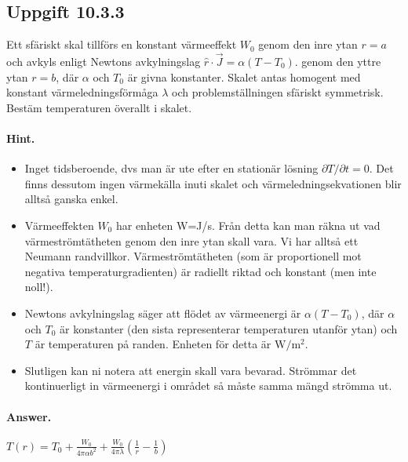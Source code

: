 \documentclass[%
oneside,                 %
final,                   %
10pt]{article}
\newenvironment{doconceexercise}{}{}
\newcounter{doconceexercisecounter}
\begin{document}
\begin{doconceexercise}

\subsection{Uppgift 10.3.3}

Ett sfäriskt skal tillförs en konstant värmeeffekt $W_0$ genom den inre  ytan $r= a$ och avkyls enligt Newtons avkylningslag
$\hat r\cdot \vec J = \alpha\left(T-T_0\right)$.
genom den yttre ytan $r = b$, där $\alpha$ och $T_0$ är givna konstanter. Skalet antas homogent med konstant värmeledningsförmåga $\lambda$ och problemställningen sfäriskt symmetrisk. Bestäm temperaturen överallt i skalet.


\paragraph{Hint.}
\begin{itemize}
\item Inget tidsberoende, dvs man är ute efter en stationär lösning $\partial T / \partial t = 0$. Det finns dessutom ingen värmekälla inuti skalet och värmeledningsekvationen blir alltså ganska enkel.

\item Värmeeffekten $W_0$ har enheten W=J/s. Från detta kan man räkna ut vad värmeströmtätheten genom den inre ytan skall vara. Vi har alltså ett Neumann randvillkor. Värmeströmtätheten (som är proportionell mot negativa temperaturgradienten) är radiellt riktad och konstant (men inte noll!).

\item Newtons avkylningslag säger att flödet av värmeenergi är $\alpha(T-T_0)$, där $\alpha$ och $T_0$ är konstanter (den sista representerar temperaturen utanför ytan) och $T$ är temperaturen på randen. Enheten för detta är $\mathrm{W}/\mathrm{m}^2$.

\item Slutligen kan ni notera att energin skall vara bevarad. Strömmar det kontinuerligt in värmeenergi i området så måste samma mängd strömma ut.
\end{itemize}

\noindent


\paragraph{Answer.}
$T\left(r\right) = T_0 + \frac{W_0}{4\pi \alpha b^2} + \frac{W_0}{4\pi \lambda}
\left(\frac{1}{r} - \frac{1}{b}\right)$


\end{doconceexercise}
\end{document}
